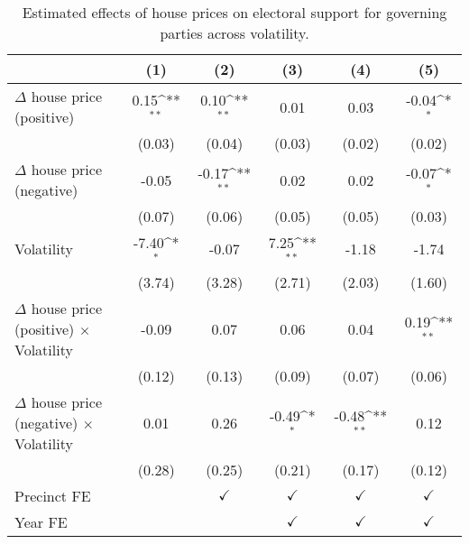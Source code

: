 \begin{table}[htbp]\centering
\def\sym#1{\ifmmode^{#1}\else\(^{#1}\)\fi}
\caption{Estimated effects of house prices on electoral support for governing parties across volatility.} \label{tab6}
\begin{tabular}{l*{5}{c}}
\hline\hline
                    &\multicolumn{1}{c}{(1)}        &\multicolumn{1}{c}{(2)}        &\multicolumn{1}{c}{(3)}        &\multicolumn{1}{c}{(4)}        &\multicolumn{1}{c}{(5)}        \\
\hline
$\Delta$ house price (positive)&        0.15\sym{**}&        0.10\sym{**}&        0.01        &        0.03        &       -0.04\sym{*} \\
                    &      (0.03)        &      (0.04)        &      (0.03)        &      (0.02)        &      (0.02)        \\
[1em]
$\Delta$ house price (negative)&       -0.05        &       -0.17\sym{**}&        0.02        &        0.02        &       -0.07\sym{*} \\
                    &      (0.07)        &      (0.06)        &      (0.05)        &      (0.05)        &      (0.03)        \\
[1em]
Volatility          &       -7.40\sym{*} &       -0.07        &        7.25\sym{**}&       -1.18        &       -1.74        \\
                    &      (3.74)        &      (3.28)        &      (2.71)        &      (2.03)        &      (1.60)        \\
[1em]
$\Delta$ house price (positive) $\times$ Volatility&       -0.09        &        0.07        &        0.06        &        0.04        &        0.19\sym{**}\\
                    &      (0.12)        &      (0.13)        &      (0.09)        &      (0.07)        &      (0.06)        \\
[1em]
$\Delta$ house price (negative) $\times$ Volatility&        0.01        &        0.26        &       -0.49\sym{*} &       -0.48\sym{**}&        0.12        \\
                    &      (0.28)        &      (0.25)        &      (0.21)        &      (0.17)        &      (0.12)        \\
[1em]
\hline Precinct FE  &                    &$\checkmark$        &$\checkmark$        &$\checkmark$        &$\checkmark$        \\
[1em]
Year FE             &                    &                    &$\checkmark$        &$\checkmark$        &$\checkmark$        \\

\end{tabular}
\end{table}
